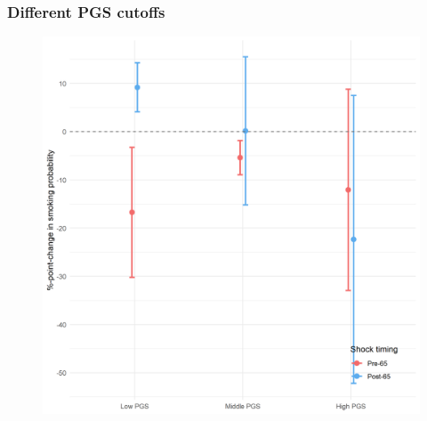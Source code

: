 \documentclass[10pt,compress,xcolor=dvipsnames]{beamer}    %
\newcounter{ex}
\newcommand{\1}[1]{\mathrm{1\hspace*{-2.5pt}l}[#1]}	%
\begin{document}
\begin{frame}
\frametitle{Different PGS cutoffs}

\begin{figure}[hbtp]
\centering
\includegraphics[height=0.8\textheight]{../../3_output/shock_effects/robustness_6070__3pgs_cvplot.png}
\label{fig:3pgs}
\end{figure}

\end{frame}
\end{document}
